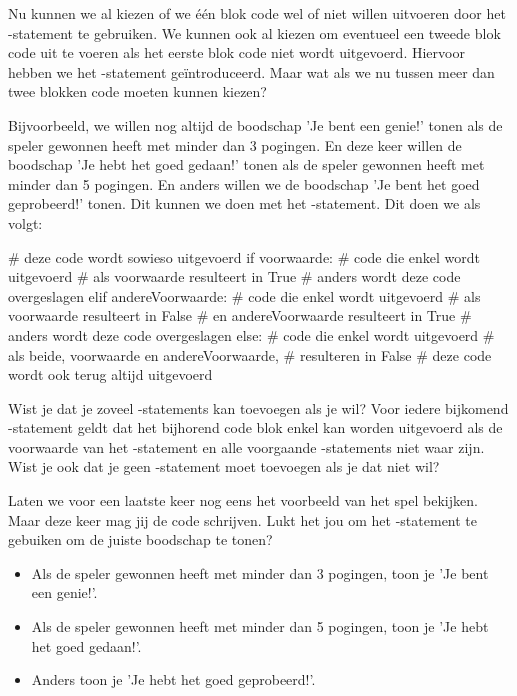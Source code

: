 Nu kunnen we al kiezen of we \'e\'en blok code wel of niet willen uitvoeren door het -statement te gebruiken.
We kunnen ook al kiezen om eventueel een tweede blok code uit te voeren als het eerste blok code niet wordt uitgevoerd.
Hiervoor hebben we het -statement ge\"introduceerd.
Maar wat als we nu tussen meer dan twee blokken code moeten kunnen kiezen?
\par
Bijvoorbeeld, we willen nog altijd de boodschap 'Je bent een genie!' tonen als de speler gewonnen heeft met minder dan 3 pogingen.
En deze keer willen de boodschap 'Je hebt het goed gedaan!' tonen als de speler gewonnen heeft met minder dan 5 pogingen.
En anders willen we de boodschap 'Je bent het goed geprobeerd!' tonen.
Dit kunnen we doen met het -statement.
Dit doen we als volgt:
\begin{pyEnv}
# deze code wordt sowieso uitgevoerd
if voorwaarde:
	# code die enkel wordt uitgevoerd
	# als voorwaarde resulteert in True
	# anders wordt deze code overgeslagen
elif andereVoorwaarde:
	# code die enkel wordt uitgevoerd
	# als voorwaarde resulteert in False
	# en andereVoorwaarde resulteert in True
	# anders wordt deze code overgeslagen
else:
	# code die enkel wordt uitgevoerd
	# als beide, voorwaarde en andereVoorwaarde,
	# resulteren in False
# deze code wordt ook terug altijd uitgevoerd
\end{pyEnv}

Wist je dat je zoveel -statements kan toevoegen als je wil?
Voor iedere bijkomend -statement geldt dat het bijhorend code blok enkel kan worden uitgevoerd
als de voorwaarde van het -statement en alle voorgaande -statements niet waar zijn.
\newline
Wist je ook dat je geen -statement moet toevoegen als je dat niet wil?

\begin{letsTryOut}
	Laten we voor een laatste keer nog eens het voorbeeld van het spel bekijken.
	Maar deze keer mag jij de code schrijven.
	Lukt het jou om het -statement
	te gebuiken om de juiste boodschap te tonen?
	\begin{itemize}
		\item Als de speler gewonnen heeft met minder dan 3 pogingen, toon je 'Je bent een genie!'.
		\item Als de speler gewonnen heeft met minder dan 5 pogingen, toon je 'Je hebt het goed gedaan!'.
		\item Anders toon je 'Je hebt het goed geprobeerd!'.
	\end{itemize}
\end{letsTryOut}

